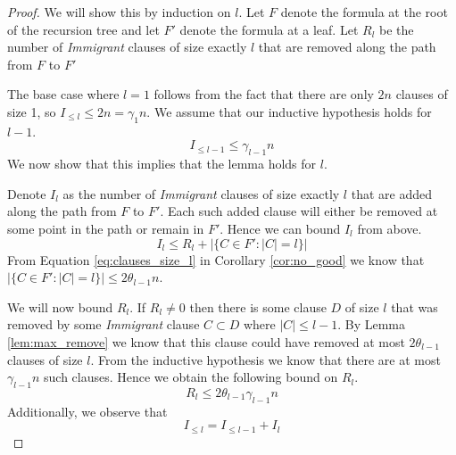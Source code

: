 \begin{proof}
    We will show this by induction on $l$.
    Let $F$ denote the formula at the root of the recursion tree and let $F'$ denote the formula
    at a leaf. Let $R_l$ be the number of \textit{Immigrant} clauses of size exactly $l$ that are
    removed along the path from $F$ to $F'$
    
    The base case where $l = 1$ follows from the fact that there are only $2n$ clauses of size 1,
    so $I_{\leq l} \leq 2n = \gamma_1 n$. We assume that our inductive hypothesis holds for $l - 1$.
    \begin{equation} \label{eq:inductive_hyp}
        I_{\leq l - 1} \leq \gamma_{l-1} n
    \end{equation}
    We now show that this implies that the lemma holds for $l$.
    
    Denote $I_l$ as the number of \textit{Immigrant} clauses of size exactly $l$ that are added along
    the path from $F$ to $F'$. Each such added clause will either be removed at some point in the path
    or remain in $F'$. Hence we can bound $I_l$ from above.
    \begin{equation} \label{eq:bound_immigrant_exact}
        I_l \leq R_l + |\{C \in F' : |C| = l\}|
    \end{equation}
    From Equation \ref{eq:clauses_size_l} in Corollary \ref{cor:no_good} we know that
    $|\{C \in F' : |C| = l\}| \leq 2 \theta_{l-1}n$.
    
    We will now bound $R_l$. If $R_l \neq 0$ then there is some clause $D$ of size $l$ that was removed
    by some \textit{Immigrant} clause $C \subset D$ where $|C| \leq l -1$. 
    By Lemma \ref{lem:max_remove} we know that this clause
    could have removed at most $2 \theta_{l-1}$ clauses of size $l$. From the inductive hypothesis
    we know that there are at most $\gamma_{l-1} n$ such clauses. Hence we obtain the following bound on $R_l$.
    \begin{equation} \label{eq:bound_removals}
        R_l \leq 2\theta_{l-1}\gamma_{l-1}n
    \end{equation}
    Additionally, we observe that
    \begin{equation} \label{eq:ineq_eq}
        I_{\leq l} = I_{\leq l - 1} + I_{l}
    \end{equation}
    

\end{proof}
